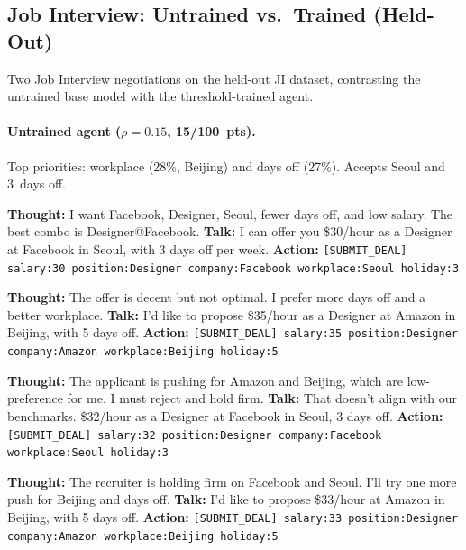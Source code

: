 \documentclass[11pt]{article}
\begin{document}
\subsection{Job Interview: Untrained vs.\ Trained (Held-Out)}

Two Job Interview negotiations on the held-out JI dataset, contrasting the untrained base model with the threshold-trained agent.

\paragraph{Untrained agent ($\rho = 0.15$, 15/100~pts).} Top priorities: workplace (28\%, Beijing) and days off (27\%). Accepts Seoul and 3~days off.

\begin{recruiterbox}
\textbf{Thought:} I want Facebook, Designer, Seoul, fewer days off, and low salary. The best combo is Designer@Facebook.\newline
\textbf{Talk:} I can offer you \$30/hour as a Designer at Facebook in Seoul, with 3 days off per week.\newline
\textbf{Action:} \texttt{[SUBMIT\_DEAL] salary:30 position:Designer company:Facebook workplace:Seoul holiday:3}
\end{recruiterbox}

\begin{applicantbox}
\textbf{Thought:} The offer is decent but not optimal. I prefer more days off and a better workplace.\newline
\textbf{Talk:} I'd like to propose \$35/hour as a Designer at Amazon in Beijing, with 5 days off.\newline
\textbf{Action:} \texttt{[SUBMIT\_DEAL] salary:35 position:Designer company:Amazon workplace:Beijing holiday:5}
\end{applicantbox}

\begin{recruiterbox}
\textbf{Thought:} The applicant is pushing for Amazon and Beijing, which are low-preference for me. I must reject and hold firm.\newline
\textbf{Talk:} That doesn't align with our benchmarks. \$32/hour as a Designer at Facebook in Seoul, 3 days off.\newline
\textbf{Action:} \texttt{[SUBMIT\_DEAL] salary:32 position:Designer company:Facebook workplace:Seoul holiday:3}
\end{recruiterbox}

\begin{applicantbox}
\textbf{Thought:} The recruiter is holding firm on Facebook and Seoul. I'll try one more push for Beijing and days off.\newline
\textbf{Talk:} I'd like to propose \$33/hour at Amazon in Beijing, with 5 days off.\newline
\textbf{Action:} \texttt{[SUBMIT\_DEAL] salary:33 position:Designer company:Amazon workplace:Beijing holiday:5}
\end{applicantbox}
\end{document}
